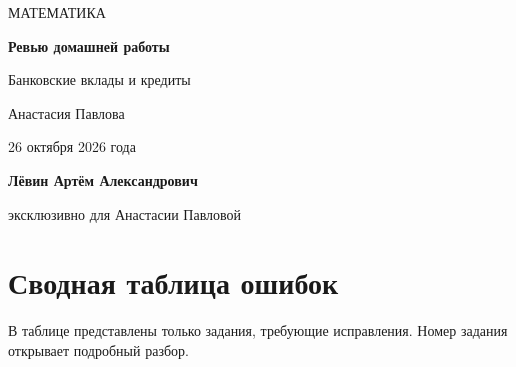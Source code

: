 \documentclass[a4paper,11pt]{article}
\begin{document}
\thispagestyle{empty}
\vspace*{35mm}
\begin{center}
{\large\color{muted} МАТЕМАТИКА}\par\vspace{12mm}
{\Huge\bfseries Ревью домашней работы}\par\vspace{7mm}
{\Large Банковские вклады и кредиты}\par\vspace{20mm}
{\Large Анастасия Павлова}\par\vspace{13mm}
{\large 26 октября 2026 года}\par
\end{center}
\vfill
\begin{center}
\textbf{Лёвин Артём Александрович}\par
эксклюзивно для Анастасии Павловой
\end{center}
\vspace{10mm}
\begin{center}
\end{center}
\clearpage
\section*{Сводная таблица ошибок}
В таблице представлены только задания, требующие исправления. Номер задания открывает подробный разбор.
\end{document}

